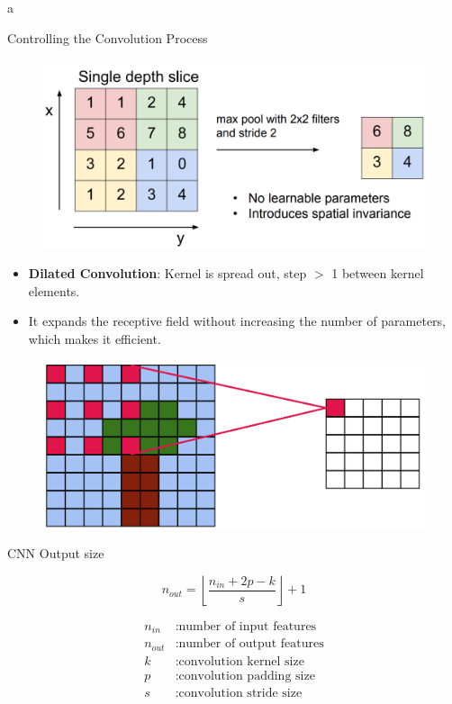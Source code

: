 a\documentclass[10pt]{beamer}
\theoremstyle{remark}
\theoremstyle{definition}
\begin{document}
\begin{frame}[allowframebreaks]{Controlling the Convolution Process}
\begin{figure}
\centering
\includegraphics[width=1.0\textwidth,height=0.8\textheight,keepaspectratio]{./images/pool_2.png}
\end{figure}
    
\framebreak

\begin{itemize}
    \item \textbf{Dilated Convolution}: Kernel is spread out, step $>$ 1 between kernel elements.
    \item It expands the receptive field without increasing the number of parameters, which makes it efficient.
\end{itemize}


\begin{figure}
\centering
\includegraphics[width=1.0\textwidth,height=0.8\textheight,keepaspectratio]{./images/dilated.png}
\end{figure}

\end{frame}

\begin{frame}[allowframebreaks]{CNN Output size}


\[
n_{out} = \left\lfloor \frac{n_{in} + 2p - k}{s} \right\rfloor + 1
\]

\begin{align*}
n_{in} &: \text{number of input features} \\
n_{out} &: \text{number of output features} \\
k &: \text{convolution kernel size} \\
p &: \text{convolution padding size} \\
s &: \text{convolution stride size}
\end{align*}


\end{frame}
\end{document}

